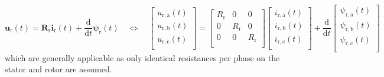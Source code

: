\begin{frame}
\begin{equation}
            \bm{u}_\mathrm{r}(t) = \bm{R}_\mathrm{r}\bm{i}_\mathrm{r}(t)+\frac{\mathrm{d}}{\mathrm{d}t}\bm{\psi}_\mathrm{r}(t) \quad \Leftrightarrow \quad \begin{bmatrix}
                u_{\mathrm{r,a}}(t)\\
                u_{\mathrm{r,b}}(t)\\
                u_{\mathrm{r,c}}(t)\\
            \end{bmatrix} = \begin{bmatrix}
                R_\mathrm{r} & 0 & 0\\
                0 & R_\mathrm{r} & 0\\
                0 & 0 & R_\mathrm{r}\\
            \end{bmatrix} \begin{bmatrix}
                i_{\mathrm{r,a}}(t)\\
                i_{\mathrm{r,b}}(t)\\
                i_{\mathrm{r,c}}(t)\\
            \end{bmatrix} + \frac{\mathrm{d}}{\mathrm{d}t} \begin{bmatrix}
                \psi_{\mathrm{r,a}}(t)\\
                \psi_{\mathrm{r,b}}(t)\\
                \psi_{\mathrm{r,c}}(t)\\
            \end{bmatrix}
    \end{equation}
which are generally applicable as only identical resistances per phase on the stator and rotor are assumed.
\end{frame}

